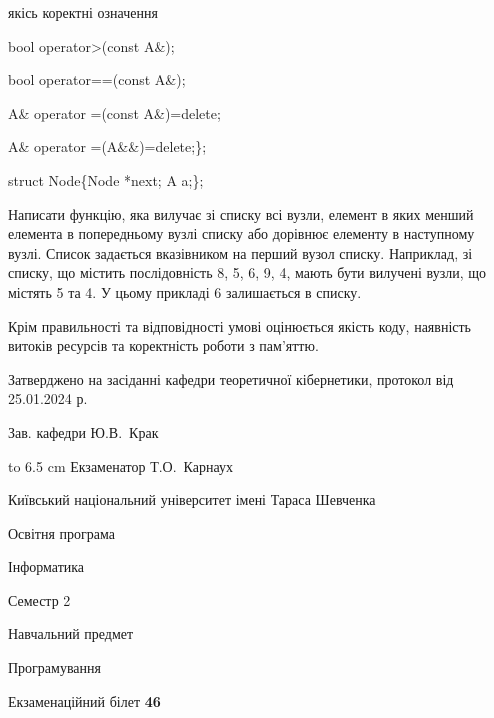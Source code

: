 \documentclass[12pt, ukrainian]{article}
\begin{document}
{\quad  якісь коректні означення 

\quad  bool operator>(const A\&); 

\quad  bool operator==(const A\&); 

\quad A\& operator =(const A\&)=delete; 

\quad  A\& operator =(A\&\&)=delete;\};

struct Node\{Node *next; A a;\};

 Написати функцію, яка вилучає зі списку всі вузли, елемент в яких менший елемента в попередньому вузлі списку або дорівнює елементу в наступному вузлі. Список задається вказівником на перший вузол списку. Наприклад, зі списку, що містить послідовність 8, 5, 6, 9, 4, мають бути вилучені вузли, що містять 5 та 4. У цьому прикладі 6 залишається в списку.

Крім правильності та відповідності умові оцінюється якість коду, наявність витоків ресурсів та коректність роботи з пам'яттю. 

}
{\smallskip\smallskip \begin {scriptsize} Затверджено на засіданні кафедри теоретичної кібернетики, протокол   від   25.01.2024 р.\par\smallskip\smallskip\smallskip\smallskip
{\parbox {6.5 cm} {Зав. кафедри \dotfill Ю.В.~Крак}}\hspace {0.7cm} {\hbox to 6.5 cm { Екзаменатор \dotfill Т.О.~Карнаух}} \end{scriptsize}}
\newpage
{{\begin {scriptsize}\par
{ \center  Київський національний університет імені Тараса Шевченка \par}
{\parbox {5 cm}{Освітня програма \hfill}{\parbox {7 cm}{Інформатика\hfill}}\parbox {6 cm}{\hfill Семестр 2}}\par
{\parbox {5 cm} {Навчальний предмет \hfill}\parbox {7 cm}{Програмування \hfill}\parbox {6cm}{\hfill}\par}\vspace{-15pt} \end{scriptsize}}{\center Екзаменаційний білет \No \textbf { 46 }\par}}
\end{document}
